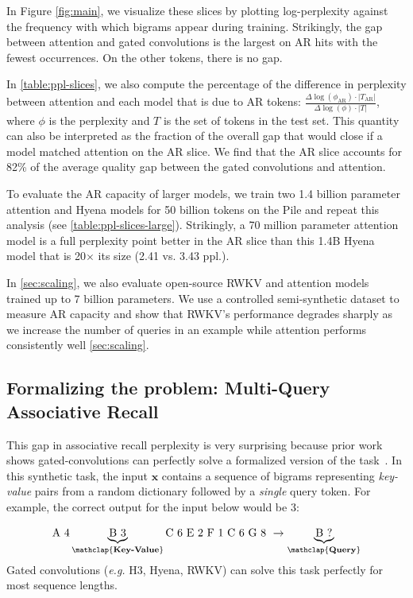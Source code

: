 In Figure \ref{fig:main}, we visualize these slices by plotting log-perplexity against the frequency with which bigrams appear during training. Strikingly, the gap between attention and gated convolutions is the largest on AR hits with the fewest occurrences. On the other tokens, there is no gap. 

In \ref{table:ppl-slices}, we also compute the percentage of the difference in perplexity between attention and each model that is due to AR tokens: $\frac{\Delta \log(\phi_\text{AR}) \cdot |T_\text{AR}|}{\Delta \log(\phi) \cdot |T|}$, where $\phi$ is the perplexity and $T$ is the set of tokens in the test set. This quantity can also be interpreted as the fraction of the overall gap that would close if a model matched attention on the AR slice. We find that the AR slice accounts for 82\% of the average quality gap between the gated convolutions and attention. 

To evaluate the AR capacity of larger models, we train two 1.4 billion parameter attention and Hyena models for 50 billion tokens on the Pile and repeat this analysis (see \ref{table:ppl-slices-large}). 
Strikingly, a 70 million parameter attention model is a full perplexity point better in the AR slice than this 1.4B Hyena model that is 20$\times$ its size (2.41 vs. 3.43 ppl.). 

In \ref{sec:scaling}, we also evaluate open-source RWKV and attention models trained up to 7 billion parameters. We use a controlled semi-synthetic dataset to measure AR capacity and show that RWKV's performance degrades sharply as we increase the number of queries in an example while attention performs consistently well \ref{sec:scaling}. 

\subsection{Formalizing the problem: Multi-Query Associative Recall} This gap in associative recall perplexity is very surprising because prior work shows gated-convolutions can perfectly solve a formalized version of the task~\citep{dao2022hungry,poli2023hyena,olsson2022context}. In this synthetic task, the input $\bm{x}$ contains a sequence of bigrams representing \textit{key-value} pairs from a random dictionary followed by a \textit{single} query token. For example, the correct output for the input below would be $3$: 

$$
\text{A 4} \underbrace{\text{B 3}}_{\mathclap{\textbf{Key-Value}}}  \text{C 6 E 2 F 1 C 6 G 8 } \rightarrow
 \underbrace{\text{B ?}}_{\mathclap{\textbf{Query}}}
$$
Gated convolutions (\textit{e.g.} H3, Hyena, RWKV) can solve this task perfectly for most sequence lengths. 

